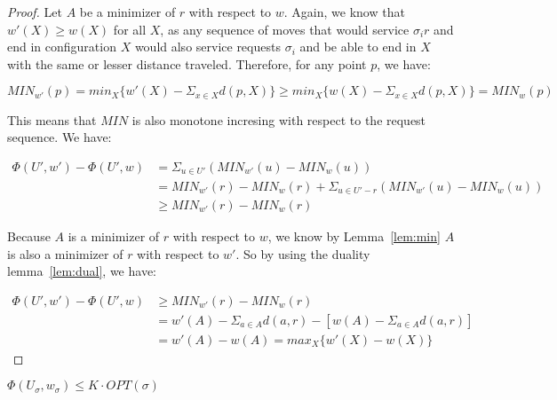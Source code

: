 \begin{proof}
    Let $A$ be a minimizer of $r$ with respect to $w$. Again, we know that $w'(X) \geq w(X)$ for all $X$, as any sequence of moves that would service $\sigma_i r$ and end in configuration $X$ would also service requests $\sigma_i$ and be able to end in $X$ with the same or lesser distance traveled. Therefore, for any point $p$, we have: 

    \begin{equation*}
        MIN_{w'}(p) = min_{X} \{w'(X) - \Sigma_{x \in X} d(p,X) \} \geq min_{X} \{w(X) - \Sigma_{x \in X} d(p,X)  \} = MIN_w(p)
    \end{equation*}

    This means that $MIN$ is also monotone incresing with respect to the request sequence. We have:

    \begin{equation*}
        \begin{split}
            \Phi(U', w') - \Phi(U', w) &= \Sigma_{u \in U'} (MIN_{w'}(u) - MIN_w(u)) \\
            &= MIN_{w'} (r) - MIN_w(r) + \Sigma_{u \in U' - r} (MIN_{w'} (u) - MIN_w(u))\\
            &\geq MIN_{w'} (r) - MIN_w(r)
        \end{split}
    \end{equation*}

    Because $A$ is a minimizer of $r$ with respect to $w$, we know by Lemma~\ref{lem:min} $A$ is also a minimizer of $r$ with respect to $w'$. So by using the duality lemma~\ref{lem:dual}, we have:

    \begin{equation*}
        \begin{split}
            \Phi(U', w') - \Phi(U', w) &\geq MIN_{w'} (r) - MIN_w(r) \\
            &= w'(A) - \Sigma_{a \in A} d(a,r) - [w(A) - \Sigma_{a \in A} d(a,r)] \\
            &= w'(A) - w(A) = max_X \{ w'(X) - w(X)\}
        \end{split}
    \end{equation*}
\end{proof}

\begin{lemma}
    \label{lem:er1}
    $\Phi(U_\sigma, w_\sigma) \leq K \cdot  OPT(\sigma)$
\end{lemma}


